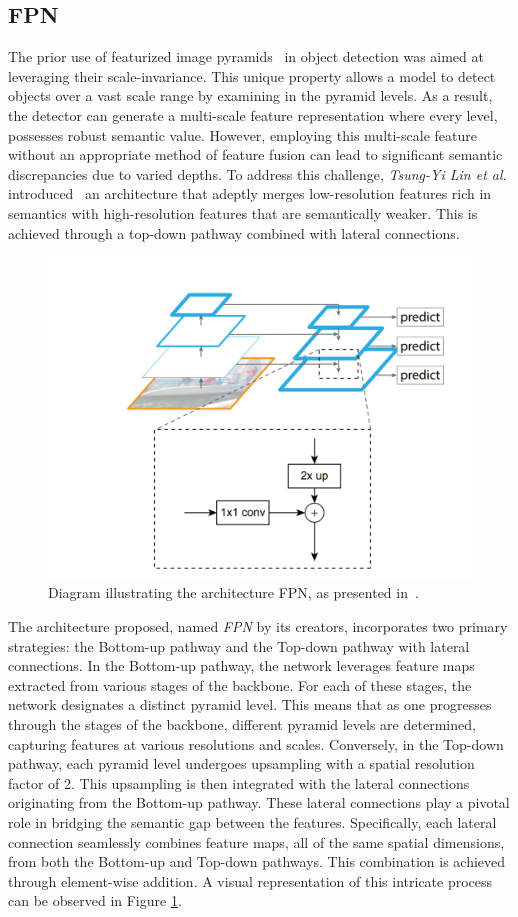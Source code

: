 \subsection{FPN}
The prior use of featurized image pyramids~\cite{adelson1984pmi} in object detection was aimed at leveraging their scale-invariance. This unique property allows a model to detect objects over a vast scale range by examining in the pyramid levels. As a result, the detector can generate a multi-scale feature representation where every level, possesses robust semantic value. However, employing this multi-scale feature without an appropriate method of feature fusion can lead to significant semantic discrepancies due to varied depths.
To address this challenge, \textit{Tsung-Yi Lin et al.} introduced~\cite{Lin_2017_CVPR} an architecture that adeptly merges low-resolution features rich in semantics with high-resolution features that are semantically weaker. This is achieved through a top-down pathway combined with lateral connections.\\

\begin{figure}[htb]
    \centering
    \includegraphics[width=0.65\linewidth]{figures/chapters-imgs/30/fpn-arq.png}
    \caption{Diagram illustrating the architecture FPN, as presented in~\cite{Lin_2017_CVPR}.}
    \label{fig:fpn-arq}
\end{figure}

The architecture proposed, named \textit{FPN} by its creators, incorporates two primary strategies: the Bottom-up pathway and the Top-down pathway with lateral connections. 
In the Bottom-up pathway, the network leverages feature maps extracted from various stages of the backbone. For each of these stages, the network designates a distinct pyramid level. This means that as one progresses through the stages of the backbone, different pyramid levels are determined, capturing features at various resolutions and scales.
Conversely, in the Top-down pathway, each pyramid level undergoes upsampling with a spatial resolution factor of 2. This upsampling is then integrated with the lateral connections originating from the Bottom-up pathway. These lateral connections play a pivotal role in bridging the semantic gap between the features. Specifically, each lateral connection seamlessly combines feature maps, all of the same spatial dimensions, from both the Bottom-up and Top-down pathways. This combination is achieved through element-wise addition. A visual representation of this intricate process can be observed in Figure \ref{fig:fpn-arq}.\\

